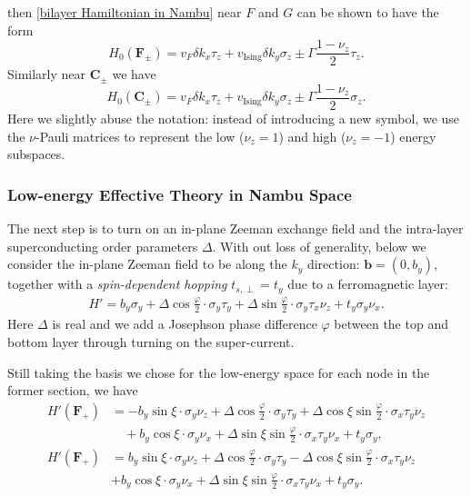 \begin{subappendices}
			then \eqref{bilayer Hamiltonian in Nambu} near $F$ and $G$ can be shown to have the form
			\begin{equation}\label{H0 F,G}
				H_0(\bm{F}_\pm)=v_F\delta k_x\tau_z+v_{\text{Ising}}\delta k_y\sigma_z\pm\Gamma\dfrac{1-\nu_z}{2}\tau_z.
			\end{equation}
			Similarly near $\bm{C}_\pm$ we have
			\begin{equation}\label{H0 C,D}
				H_0(\bm{C}_\pm)=v_F\delta k_x\tau_z+v_{\text{Ising}}\delta k_y\sigma_z\pm\Gamma\dfrac{1-\nu_z}{2}\sigma_z.
			\end{equation}
			Here we slightly abuse the notation: instead of introducing a new symbol, we use the $\nu$-Pauli matrices to represent the low ($\nu_z=1$) and high ($\nu_z=-1$) energy subspaces.
		\subsubsection{Low-energy Effective Theory in Nambu Space}
			The next step is to turn on an in-plane Zeeman exchange field and the intra-layer superconducting order parameters $\Delta$. With out loss of generality, below we consider the in-plane Zeeman field to be along the $k_y$ direction: $\bm{b}=(0,b_y)$, together with a \emph{spin-dependent hopping} $t_{s,\perp}=t_y$ due to a ferromagnetic layer:
			\begin{align}\label{H'}
				H'=b_y\sigma_y+\Delta\cos\frac{\varphi}{2}\cdot \sigma_y\tau_y+\Delta\sin\frac{\varphi}{2}\cdot\sigma_y\tau_x\nu_z+t_y\sigma_y\nu_x.
			\end{align}
			Here $\Delta$ is real and we add a Josephson phase difference $\varphi$ between the top and bottom layer through turning on the super-current.\par
			Still taking the basis we chose for the low-energy space for each node in the former section, we have			
				\begin{align}\label{H' for Q+ and Q-}
					H'(\bm{F}_+)&=-b_y\sin\xi\cdot\sigma_y\nu_z+\Delta\cos\frac{\varphi}{2}\cdot\sigma_y\tau_y+\Delta\cos\xi\sin\frac{\varphi}{2}\cdot\sigma_x\tau_y\nu_z\nonumber\\
                    &\quad+b_y\cos\xi\cdot\sigma_y\nu_x+\Delta\sin\xi\sin\frac{\varphi}{2}\cdot\sigma_x\tau_y\nu_x+t_y\sigma_y,\\
					H'(\bm{F}_+)&=b_y\sin\xi\cdot\sigma_y\nu_z+\Delta\cos\frac{\varphi}{2}\cdot\sigma_y\tau_y-\Delta\cos\xi\sin\frac{\varphi}{2}\cdot\sigma_x\tau_y\nu_z\nonumber\\
                    &+b_y\cos\xi\cdot\sigma_y\nu_x+\Delta\sin\xi\sin\frac{\varphi}{2}\cdot\sigma_x\tau_y\nu_x+t_y\sigma_y.

\end{align}
\end{subappendices}

